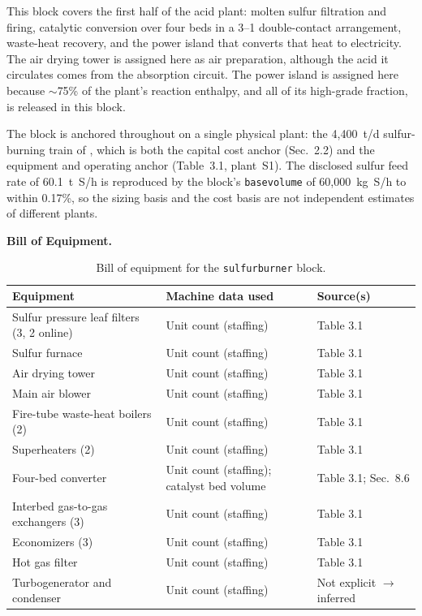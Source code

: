 \documentclass{article}
\renewcommand\_{\textunderscore\allowbreak}
\begin{document}
This block covers the first half of the acid plant: molten sulfur filtration and firing, catalytic  conversion over four beds in a 3--1 double-contact arrangement, waste-heat recovery, and the power island that converts that heat to electricity. The air drying tower is assigned here as air preparation, although the acid it circulates comes from the absorption circuit. The power island is assigned here because $\sim$75\% of the plant's reaction enthalpy, and all of its high-grade fraction, is released in this block.
 
The block is anchored throughout on a single physical plant: the 4,400~t/d  sulfur-burning train of \citet{davenportSulfuricAcidManufacture2006}, which is both the capital cost anchor (Sec.~2.2) and the equipment and operating anchor (Table~3.1, plant~S1). The disclosed sulfur feed rate of 60.1~t~S/h is reproduced by the block's \texttt{base\_volume} of 60,000~kg~S/h to within 0.17\%, so the sizing basis and the cost basis are not independent estimates of different plants.

\medskip
\noindent\textbf{Bill of Equipment.}\quad
 
\begin{table}[h!]
\caption{Bill of equipment for the \texttt{sulfur\_burner} block.}
\label{tab:c-equip-sulfurburner}
\centering
\begin{tabular}{>{\raggedright\arraybackslash}p{5.2cm}
                >{\raggedright\arraybackslash}p{4cm}
                >{\raggedright\arraybackslash}p{4.5cm}}
\toprule
\textbf{Equipment} & \textbf{Machine data used} & \textbf{Source(s)} \\
\midrule
Sulfur pressure leaf filters (3, 2 online) & Unit count (staffing) & Table 3.1 \\
Sulfur furnace & Unit count (staffing) & Table 3.1 \\
Air drying tower & Unit count (staffing) & Table 3.1 \\
Main air blower & Unit count (staffing) & Table 3.1 \\
Fire-tube waste-heat boilers (2) & Unit count (staffing) & Table 3.1 \\
Superheaters (2) & Unit count (staffing) & Table 3.1 \\
Four-bed converter & Unit count (staffing); catalyst bed volume & Table 3.1; Sec.~8.6 \\
Interbed gas-to-gas exchangers (3) & Unit count (staffing) & Table 3.1 \\
Economizers (3) & Unit count (staffing) & Table 3.1 \\
Hot gas filter & Unit count (staffing) & Table 3.1 \\
Turbogenerator and condenser & Unit count (staffing) & Not explicit $\rightarrow$ inferred \\
\bottomrule
\end{tabular}
\end{table}
\end{document}

